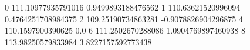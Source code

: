 0 111.10977935791016 0.9499893188476562
1 110.63621520996094 0.4764251708984375
2 109.25190734863281 -0.9078826904296875
4 110.1597900390625 0.0
6 111.2502670288086 1.0904769897460938
8 113.98250579833984 3.8227157592773438
